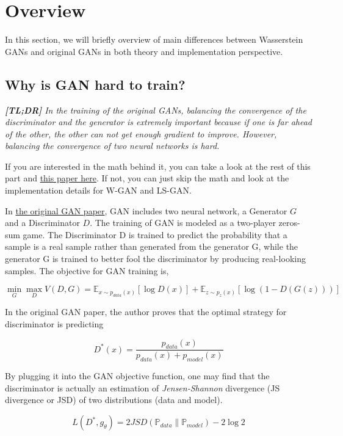 \documentclass[]{book}
\theoremstyle{definition}
\theoremstyle{definition}
\theoremstyle{definition}
\theoremstyle{remark}
\begin{document}
\section{Overview}\label{overview}

In this section, we will briefly overview of main differences between
Wasserstein GANs and original GANs in both theory and implementation
perspective.

\subsection{Why is GAN hard to train?}\label{why-is-gan-hard-to-train}

\emph{\textbf{{[}TL;DR{]}} In the training of the original GANs,
balancing the convergence of the discriminator and the generator is
extremely important because if one is far ahead of the other, the other
can not get enough gradient to improve. However, balancing the
convergence of two neural networks is hard.}

If you are interested in the math behind it, you can take a look at the
rest of this part and \href{https://arxiv.org/pdf/1701.04862.pdf}{this
paper here}. If not, you can just skip the math and look at the
implementation details for W-GAN and LS-GAN.

In \href{https://arxiv.org/pdf/1406.2661v1.pdf}{the original GAN paper},
GAN includes two neural network, a Generator \(G\) and a Discriminator
\(D\). The training of GAN is modeled as a two-player zeros-sum game.
The Discriminator D is trained to predict the probability that a sample
is a real sample rather than generated from the generator G, while the
generator G is trained to better fool the discriminator by producing
real-looking samples. The objective for GAN training is,

\[\min_G\max_D V(D,G)=\mathbb{E}_{x\sim p_{data}(x)}[\log D(x)] + \mathbb{E}_{z\sim p_z(x)}[\log(1-D(G(z)))]\]

In the original GAN paper, the author proves that the optimal strategy
for discriminator is predicting

\[D^*(x)=\frac{p_{data}(x)}{p_{data}(x)+p_{model}(x)}\]

By plugging it into the GAN objective function, one may find that the
discriminator is actually an estimation of \emph{Jensen-Shannon}
divergence (JS divergence or JSD) of two distributions (data and model).

\[L(D^*,g_\theta)=2 JSD(\mathbb{P}_{data}\|\mathbb{P}_{model}) - 2\log2\]
\end{document}
